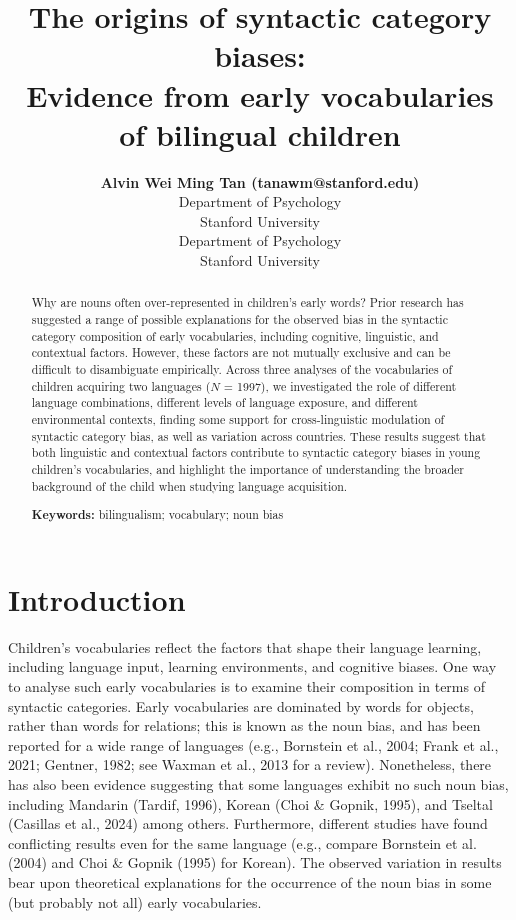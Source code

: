 \documentclass[10pt, letterpaper]{article}
\title{The origins of syntactic category biases:\\
Evidence from early vocabularies of bilingual children}
\author{{\large \bf Alvin Wei Ming Tan (tanawm@stanford.edu)} \\ Department of Psychology \\ Stanford University \AND {\large \bf Michael C. Frank} \\ Department of Psychology \\ Stanford University}
\begin{document}
\maketitle

\begin{abstract}
Why are nouns often over-represented in children's early words? Prior
research has suggested a range of possible explanations for the observed
bias in the syntactic category composition of early vocabularies,
including cognitive, linguistic, and contextual factors. However, these
factors are not mutually exclusive and can be difficult to disambiguate
empirically. Across three analyses of the vocabularies of children
acquiring two languages (\(N\) = 1997), we investigated the role of
different language combinations, different levels of language exposure,
and different environmental contexts, finding some support for
cross-linguistic modulation of syntactic category bias, as well as
variation across countries. These results suggest that both linguistic
and contextual factors contribute to syntactic category biases in young
children's vocabularies, and highlight the importance of understanding
the broader background of the child when studying language acquisition.

\textbf{Keywords:}
bilingualism; vocabulary; noun bias
\end{abstract}

\section{Introduction}\label{introduction}

Children's vocabularies reflect the factors that shape their language
learning, including language input, learning environments, and cognitive
biases. One way to analyse such early vocabularies is to examine their
composition in terms of syntactic categories. Early vocabularies are
dominated by words for objects, rather than words for relations; this is
known as the noun bias, and has been reported for a wide range of
languages (e.g., Bornstein et al., 2004; Frank et al., 2021; Gentner,
1982; see Waxman et al., 2013 for a review). Nonetheless, there has also
been evidence suggesting that some languages exhibit no such noun bias,
including Mandarin (Tardif, 1996), Korean (Choi \& Gopnik, 1995), and
Tseltal (Casillas et al., 2024) among others. Furthermore, different
studies have found conflicting results even for the same language (e.g.,
compare Bornstein et al. (2004) and Choi \& Gopnik (1995) for Korean).
The observed variation in results bear upon theoretical explanations for
the occurrence of the noun bias in some (but probably not all) early
vocabularies.
\end{document}
